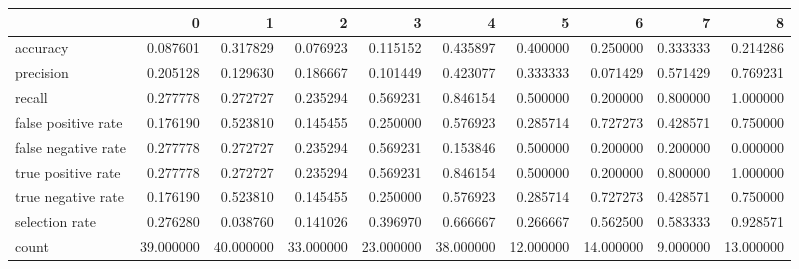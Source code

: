 \begin{tabular}{lrrrrrrrrr}
\toprule
{} &          0 &          1 &          2 &          3 &          4 &          5 &          6 &         7 &          8 \\
\midrule
accuracy            &   0.087601 &   0.317829 &   0.076923 &   0.115152 &   0.435897 &   0.400000 &   0.250000 &  0.333333 &   0.214286 \\
precision           &   0.205128 &   0.129630 &   0.186667 &   0.101449 &   0.423077 &   0.333333 &   0.071429 &  0.571429 &   0.769231 \\
recall              &   0.277778 &   0.272727 &   0.235294 &   0.569231 &   0.846154 &   0.500000 &   0.200000 &  0.800000 &   1.000000 \\
false positive rate &   0.176190 &   0.523810 &   0.145455 &   0.250000 &   0.576923 &   0.285714 &   0.727273 &  0.428571 &   0.750000 \\
false negative rate &   0.277778 &   0.272727 &   0.235294 &   0.569231 &   0.153846 &   0.500000 &   0.200000 &  0.200000 &   0.000000 \\
true positive rate  &   0.277778 &   0.272727 &   0.235294 &   0.569231 &   0.846154 &   0.500000 &   0.200000 &  0.800000 &   1.000000 \\
true negative rate  &   0.176190 &   0.523810 &   0.145455 &   0.250000 &   0.576923 &   0.285714 &   0.727273 &  0.428571 &   0.750000 \\
selection rate      &   0.276280 &   0.038760 &   0.141026 &   0.396970 &   0.666667 &   0.266667 &   0.562500 &  0.583333 &   0.928571 \\
count               &  39.000000 &  40.000000 &  33.000000 &  23.000000 &  38.000000 &  12.000000 &  14.000000 &  9.000000 &  13.000000 \\
\bottomrule
\end{tabular}
